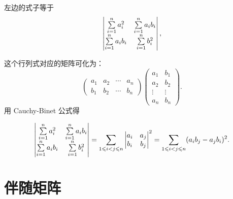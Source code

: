 \begin{solution}
    左边的式子等于
    $$ \begin{vmatrix}
        \sum_{i=1}^{n}\limits a_i^2 & \sum_{i=1}^{n}\limits a_i b_i \\
        \sum_{i=1}^{n}\limits a_i b_i & \sum_{i=1}^{n}\limits b_i^2
    \end{vmatrix}, $$

    这个行列式对应的矩阵可化为：
    $$ \begin{pmatrix}
        a_1 & a_2 & \cdots & a_n \\
        b_1 & b_2 & \cdots & b_n
    \end{pmatrix}
    \begin{pmatrix}
        a_1 & b_1 \\
        a_2 & b_2 \\
        \vdots & \vdots \\
        a_n & b_n
    \end{pmatrix}. $$
    用 Cauchy-Binet 公式得

    $$
    \begin{vmatrix}
        \sum_{i=1}^{n}\limits a_i^2 & \sum_{i=1}^{n}\limits a_i b_i \\
        \sum_{i=1}^{n}\limits a_i b_i & \sum_{i=1}^{n}\limits b_i^2
    \end{vmatrix}
    = \sum_{1 \leqslant i < j \leqslant n}
    \begin{vmatrix}
        a_i & a_j \\
        b_i & b_j
    \end{vmatrix}^2
    = \sum_{1 \leqslant i < j \leqslant n} (a_i b_j - a_j b_i)^2.
    $$
\end{solution}

\section{伴随矩阵}

